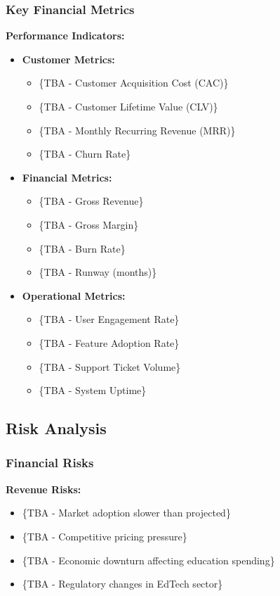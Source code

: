 \subsubsection{Key Financial Metrics}
\textbf{Performance Indicators:}
\begin{itemize}
    \item \textbf{Customer Metrics:}
    \begin{itemize}
        \item \{TBA - Customer Acquisition Cost (CAC)\}
        \item \{TBA - Customer Lifetime Value (CLV)\}
        \item \{TBA - Monthly Recurring Revenue (MRR)\}
        \item \{TBA - Churn Rate\}
    \end{itemize}
    \item \textbf{Financial Metrics:}
    \begin{itemize}
        \item \{TBA - Gross Revenue\}
        \item \{TBA - Gross Margin\}
        \item \{TBA - Burn Rate\}
        \item \{TBA - Runway (months)\}
    \end{itemize}
    \item \textbf{Operational Metrics:}
    \begin{itemize}
        \item \{TBA - User Engagement Rate\}
        \item \{TBA - Feature Adoption Rate\}
        \item \{TBA - Support Ticket Volume\}
        \item \{TBA - System Uptime\}
    \end{itemize}
\end{itemize}

\subsection{Risk Analysis}
\subsubsection{Financial Risks}
\textbf{Revenue Risks:}
\begin{itemize}
    \item \{TBA - Market adoption slower than projected\}
    \item \{TBA - Competitive pricing pressure\}
    \item \{TBA - Economic downturn affecting education spending\}
    \item \{TBA - Regulatory changes in EdTech sector\}
\end{itemize}

